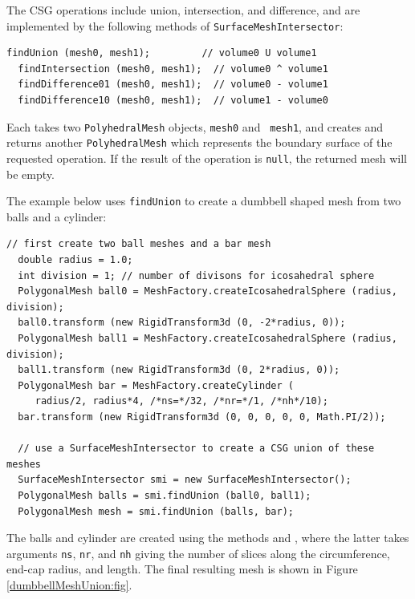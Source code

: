 The CSG operations include union, intersection, and difference, and
are implemented by the following methods of {\tt SurfaceMeshIntersector}:
%
\begin{lstlisting}[]
  findUnion (mesh0, mesh1);         // volume0 U volume1
  findIntersection (mesh0, mesh1);  // volume0 ^ volume1
  findDifference01 (mesh0, mesh1);  // volume0 - volume1 
  findDifference10 (mesh0, mesh1);  // volume1 - volume0 
\end{lstlisting}
%
Each takes two {\tt PolyhedralMesh} objects, {\tt mesh0} and {\tt
mesh1}, and creates and returns another {\tt PolyhedralMesh} which
represents the boundary surface of the requested operation. If the
result of the operation is {\tt null}, the returned mesh will be empty.

The example below uses {\tt findUnion} to create a dumbbell shaped mesh
from two balls and a cylinder:
%
\begin{lstlisting}[]
  // first create two ball meshes and a bar mesh
  double radius = 1.0;
  int division = 1; // number of divisons for icosahedral sphere
  PolygonalMesh ball0 = MeshFactory.createIcosahedralSphere (radius, division);
  ball0.transform (new RigidTransform3d (0, -2*radius, 0));
  PolygonalMesh ball1 = MeshFactory.createIcosahedralSphere (radius, division);
  ball1.transform (new RigidTransform3d (0, 2*radius, 0));
  PolygonalMesh bar = MeshFactory.createCylinder (
     radius/2, radius*4, /*ns=*/32, /*nr=*/1, /*nh*/10);
  bar.transform (new RigidTransform3d (0, 0, 0, 0, 0, Math.PI/2));

  // use a SurfaceMeshIntersector to create a CSG union of these meshes
  SurfaceMeshIntersector smi = new SurfaceMeshIntersector();
  PolygonalMesh balls = smi.findUnion (ball0, ball1);
  PolygonalMesh mesh = smi.findUnion (balls, bar);
\end{lstlisting}
%
The balls and cylinder are created using the
 methods
and
,
where the latter takes arguments {\tt ns}, {\tt nr}, and {\tt nh}
giving the number of slices along the circumference, end-cap radius,
and length. The final resulting mesh is shown in Figure
\ref{dumbbellMeshUnion:fig}.

%

